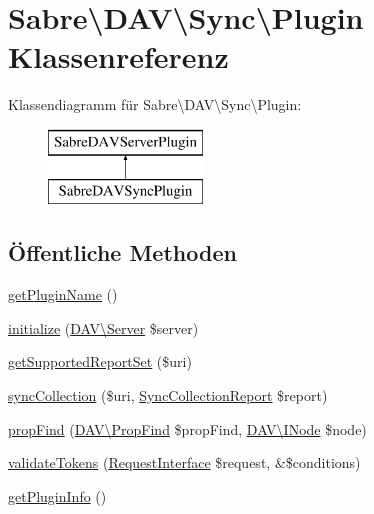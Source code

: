 \hypertarget{class_sabre_1_1_d_a_v_1_1_sync_1_1_plugin}{}\section{Sabre\textbackslash{}D\+AV\textbackslash{}Sync\textbackslash{}Plugin Klassenreferenz}
\label{class_sabre_1_1_d_a_v_1_1_sync_1_1_plugin}
Klassendiagramm für Sabre\textbackslash{}D\+AV\textbackslash{}Sync\textbackslash{}Plugin\+:\begin{figure}[H]
\begin{center}
\leavevmode
\includegraphics[height=2.000000cm]{class_sabre_1_1_d_a_v_1_1_sync_1_1_plugin}
\end{center}
\end{figure}
\subsection*{Öffentliche Methoden}
\begin{DoxyCompactItemize}
\item 
\mbox{\hyperlink{class_sabre_1_1_d_a_v_1_1_sync_1_1_plugin_ad56bbdc39a58af73eeb1d73e64228077}{get\+Plugin\+Name}} ()
\item 
\mbox{\hyperlink{class_sabre_1_1_d_a_v_1_1_sync_1_1_plugin_a24ff1a4748ba92538d987bab9ffbbc49}{initialize}} (\mbox{\hyperlink{class_sabre_1_1_d_a_v_1_1_server}{D\+A\+V\textbackslash{}\+Server}} \$server)
\item 
\mbox{\hyperlink{class_sabre_1_1_d_a_v_1_1_sync_1_1_plugin_a05039bf63ca9db884f093af0882cf7b7}{get\+Supported\+Report\+Set}} (\$uri)
\item 
\mbox{\hyperlink{class_sabre_1_1_d_a_v_1_1_sync_1_1_plugin_a825685010b7c503fd06174d72cb4907c}{sync\+Collection}} (\$uri, \mbox{\hyperlink{class_sabre_1_1_d_a_v_1_1_xml_1_1_request_1_1_sync_collection_report}{Sync\+Collection\+Report}} \$report)
\item 
\mbox{\hyperlink{class_sabre_1_1_d_a_v_1_1_sync_1_1_plugin_af1f6a52f3153e077caa7f2b4087ef1f4}{prop\+Find}} (\mbox{\hyperlink{class_sabre_1_1_d_a_v_1_1_prop_find}{D\+A\+V\textbackslash{}\+Prop\+Find}} \$prop\+Find, \mbox{\hyperlink{interface_sabre_1_1_d_a_v_1_1_i_node}{D\+A\+V\textbackslash{}\+I\+Node}} \$node)
\item 
\mbox{\hyperlink{class_sabre_1_1_d_a_v_1_1_sync_1_1_plugin_ac163c1ec0fd023d948512d50616a0ac5}{validate\+Tokens}} (\mbox{\hyperlink{interface_sabre_1_1_h_t_t_p_1_1_request_interface}{Request\+Interface}} \$request, \&\$conditions)
\item 
\mbox{\hyperlink{class_sabre_1_1_d_a_v_1_1_sync_1_1_plugin_ac768ec02a4303531cbcea3bb52ba0aaf}{get\+Plugin\+Info}} ()
\end{DoxyCompactItemize}
